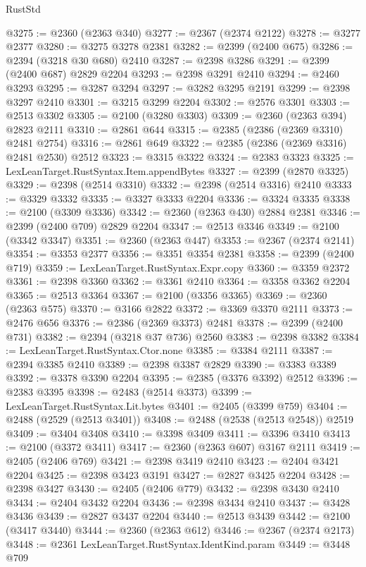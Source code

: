 \begin{lexlean}{RustStd}
\begin{coremodule}
{\begin{coremodule}
{{{{{{{{{{{{{{{{{{{{{{{{{{{{{{{{{{{{{{{{{{{{{{{{{{@3275 := @2360 (@2363 @340)
@3277 := @2367 (@2374 @2122)
@3278 := @3277 @2377
@3280 := @3275 @3278 @2381
@3282 := @2399 (@2400 @675)
@3286 := @2394 (@3218 @30 @680) @2410
@3287 := @2398 @3286
@3291 := @2399 (@2400 @687) @2829 @2204
@3293 := @2398 @3291 @2410
@3294 := @2460 @3293
@3295 := @3287 @3294
@3297 := @3282 @3295 @2191
@3299 := @2398 @3297 @2410
@3301 := @3215 @3299 @2204
@3302 := @2576 @3301
@3303 := @2513 @3302
@3305 := @2100 (@3280 @3303)
@3309 := @2360 (@2363 @394) @2823 @2111
@3310 := @2861 @644
@3315 := @2385 (@2386 (@2369 @3310) @2481 @2754)
@3316 := @2861 @649
@3322 := @2385 (@2386 (@2369 @3316) @2481 @2530) @2512
@3323 := @3315 @3322
@3324 := @2383 @3323
@3325 := LexLeanTarget.RustSyntax.Item.appendBytes
@3327 := @2399 (@2870 @3325)
@3329 := @2398 (@2514 @3310)
@3332 := @2398 (@2514 @3316) @2410
@3333 := @3329 @3332
@3335 := @3327 @3333 @2204
@3336 := @3324 @3335
@3338 := @2100 (@3309 @3336)
@3342 := @2360 (@2363 @430) @2884 @2381
@3346 := @2399 (@2400 @709) @2829 @2204
@3347 := @2513 @3346
@3349 := @2100 (@3342 @3347)
@3351 := @2360 (@2363 @447)
@3353 := @2367 (@2374 @2141)
@3354 := @3353 @2377
@3356 := @3351 @3354 @2381
@3358 := @2399 (@2400 @719)
@3359 := LexLeanTarget.RustSyntax.Expr.copy
@3360 := @3359 @2372
@3361 := @2398 @3360
@3362 := @3361 @2410
@3364 := @3358 @3362 @2204
@3365 := @2513 @3364
@3367 := @2100 (@3356 @3365)
@3369 := @2360 (@2363 @575)
@3370 := @3166 @2822
@3372 := @3369 @3370 @2111
@3373 := @2476 @656
@3376 := @2386 (@2369 @3373) @2481
@3378 := @2399 (@2400 @731)
@3382 := @2394 (@3218 @37 @736) @2560
@3383 := @2398 @3382
@3384 := LexLeanTarget.RustSyntax.Ctor.none
@3385 := @3384 @2111
@3387 := @2394 @3385 @2410
@3389 := @2398 @3387 @2829
@3390 := @3383 @3389
@3392 := @3378 @3390 @2204
@3395 := @2385 (@3376 @3392) @2512
@3396 := @2383 @3395
@3398 := @2483 (@2514 @3373)
@3399 := LexLeanTarget.RustSyntax.Lit.bytes
@3401 := @2405 (@3399 @759)
@3404 := @2488 (@2529 (@2513 @3401))
@3408 := @2488 (@2538 (@2513 @2548)) @2519
@3409 := @3404 @3408
@3410 := @3398 @3409
@3411 := @3396 @3410
@3413 := @2100 (@3372 @3411)
@3417 := @2360 (@2363 @607) @3167 @2111
@3419 := @2405 (@2406 @769)
@3421 := @2398 @3419 @2410
@3423 := @2404 @3421 @2204
@3425 := @2398 @3423 @3191
@3427 := @2827 @3425 @2204
@3428 := @2398 @3427
@3430 := @2405 (@2406 @779)
@3432 := @2398 @3430 @2410
@3434 := @2404 @3432 @2204
@3436 := @2398 @3434 @2410
@3437 := @3428 @3436
@3439 := @2827 @3437 @2204
@3440 := @2513 @3439
@3442 := @2100 (@3417 @3440)
@3444 := @2360 (@2363 @612)
@3446 := @2367 (@2374 @2173)
@3448 := @2361 LexLeanTarget.RustSyntax.IdentKind.param
@3449 := @3448 @709
}}}}}}}}}}}}}}}}}}}}}}}}}}}}}}}}}}}}}}}}}}}}}}}}}}
\end{coremodule}}
\end{coremodule}
\end{lexlean}
